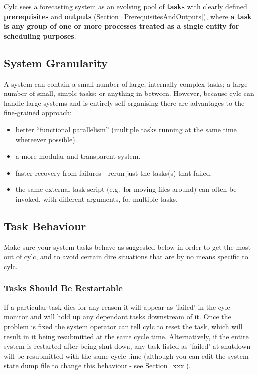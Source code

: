 \documentclass[11pt,a4paper]{article}
\begin{document}
Cylc sees a forecasting system as an evolving pool of {\bf tasks}
with clearly defined {\bf prerequisites} and {\bf outputs}
(Section~\ref{PrerequisitesAndOutputs}), where {\bf a task
is any group of one or more processes treated as a single entity for
scheduling purposes}.


\subsection{System Granularity} 
\label{System Granularity}

A system can contain a small number of large, internally complex tasks;
a large number of small, simple tasks; or anything in between. However,
because cylc can handle large systems and is entirely self organising
there are advantages to the fine-grained approach: 

\begin{itemize}
    \item better ``functional parallelism'' (multiple tasks running
        at the same time whereever possible).
    \item a more modular and transparent system.
    \item faster recovery from failures - rerun just the tasks(s) that
        failed. 
    \item the same external task script (e.g.\ for moving files around)
        can often be invoked, with different arguments, for multiple
        tasks.
\end{itemize}

\subsection{Task Behaviour} 
\label{Task Behaviour}

Make sure your system tasks behave as suggested below in order to get
the most out of cylc, and to avoid certain dire situations that are by
no means specific to cylc.

\subsubsection{Tasks Should Be Restartable}

If a particular task dies for any reason it will appear as 'failed' in
the cylc monitor and will hold up any dependant tasks downstream of it.
Once the problem is fixed the system operator can tell cylc to reset
the task, which will result in it being resubmitted at the same cycle
time. Alternatively, if the entire system is restarted after being shut
down, any task listed as 'failed' at shutdown will be resubmitted
with the same cycle time (although you can edit the system state dump
file to change this behaviour - see Section~\ref{xxx}). 
\end{document}
